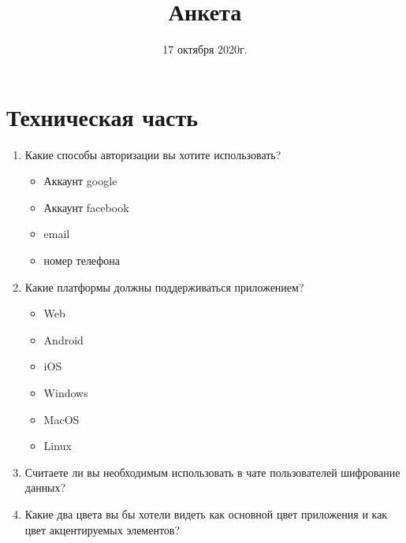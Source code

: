 \documentclass{article}
\title{Анкета}
\author{}
\date{17 октября 2020г.}
\newcommand{\red}[1]{\uline{\hspace*{1cm}\textcolor{white}{#1}\hspace*{1cm}}}
\begin{document}
  \maketitle

  \section{Техническая часть}
  \begin{enumerate}[label=\arabic*)]
    \item Какие способы авторизации вы хотите использовать?
    \begin{itemize}[label=$\square$]
      \item Аккаунт google
      \item Аккаунт facebook
      \item email
      \item номер телефона
    \end{itemize}

    \item Какие платформы должны поддерживаться приложением?
    \begin{itemize}[label=$\square$]
      \item Web
      \item Android
      \item iOS
      \item Windows
      \item MacOS
      \item Linux
    \end{itemize}

    \item Считаете ли вы необходимым использовать в чате пользователей шифрование данных? \vspace{.2cm} \\
    \red{\hspace{10cm}}

    \item Какие два цвета вы бы хотели видеть как основной цвет приложения и как цвет акцентируемых элементов? \vspace{.2cm} \\
    \red{\hspace{10cm}}


\end{enumerate}
\end{document}
